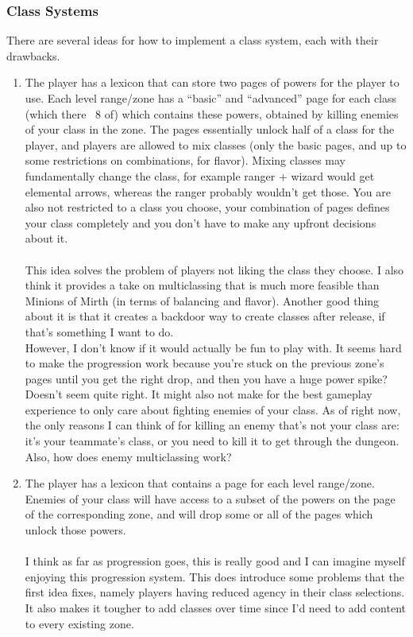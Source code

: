 \documentclass{article}
\begin{document}
\subsubsection{Class Systems}
There are several ideas for how to implement a class system, each with their drawbacks.
\begin{enumerate}
    \item The player has a lexicon that can store two pages of powers for the player to use.
        Each level range/zone has a ``basic'' and ``advanced'' page for each class (which there
        ~8 of) which contains these powers,
        obtained by killing enemies of your class in the zone. The pages essentially unlock half of a class
        for the player, and players are allowed to mix classes (only the basic pages, and up to some
        restrictions on combinations, for flavor). Mixing classes may fundamentally change the
        class, for example ranger + wizard would get elemental arrows, whereas the ranger probably wouldn't
        get those. You are also not restricted to a class you choose, your combination of pages defines
        your class completely and you don't have to make any upfront decisions about it.\\\ \\
        This idea solves the problem of players not liking the class they choose. I also think it
        provides a take on multiclassing that is much more feasible than Minions of Mirth (in terms
        of balancing and flavor). Another good thing about it is that it creates a backdoor way to
        create classes after release, if that's something I want to do.\\
        However, I don't know if it would actually be fun to play with. It
        seems hard to make the progression work because you're stuck on the previous zone's pages
        until you get the right drop, and then you have a huge power spike? Doesn't seem quite right.
        It might also not make for the best gameplay experience to only care about fighting enemies
        of your class. As of right now, the only reasons I can think of for killing an enemy that's not
        your class are: it's your teammate's class, or you need to kill it to get through the dungeon. Also,
        how does enemy multiclassing work?
    \item The player has a lexicon that contains a page for each level range/zone. Enemies of your class
        will have access to a subset of the powers on the page of the corresponding zone, and will drop some
        or all of the pages which unlock those powers. \\\ \\
        I think as far as progression goes, this is really good and I can imagine myself enjoying this
        progression system. This does introduce some problems that the first idea fixes, namely players
        having reduced agency in their class selections. It also makes it tougher to add classes over
        time since I'd need to add content to every existing zone.
\end{enumerate}
\end{document}
